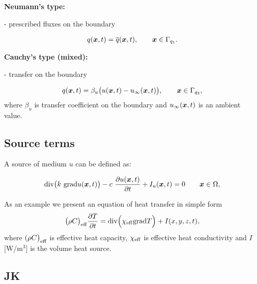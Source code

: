 {\bf Neumann's type:}

- prescribed fluxes on the boundary

\begin{eqnarray}
q(\mbox{\boldmath$x$},t) = \overline{q}(\mbox{\boldmath$x$},t), \qquad \mbox{\boldmath$x$} \in \Gamma_{q_1}. \nonumber
\end{eqnarray}

{\bf Cauchy's type (mixed):}

- transfer on the boundary

\begin{eqnarray}
q(\mbox{\boldmath$x$},t) = \beta_u\big({u}(\mbox{\boldmath$x$},t) - {u}_\infty(\mbox{\boldmath$x$},t)\big), \qquad \mbox{\boldmath$x$} \in \Gamma_{q_2}, \nonumber
\end{eqnarray}
where $\beta_u$ is transfer coefficient on the boundary and ${u}_\infty(\mbox{\boldmath$x$},t)$ is an ambient value.
\subsection{Source terms}

A source of medium $u$ can be defined as:

\begin{eqnarray}
{\rm div} \big(k\ {\rm grad} u(\tenss{x},t) \big) -  c\ \frac{\partial  u(\tenss{x},t)}{\partial t} + I_u(\tenss{x},t) = 0 \qquad \tenss{x} 
\in \Omega,\nonumber
\end{eqnarray}

As an example we present an equation of heat transfer in simple form
\begin{eqnarray}\label{hydr1}
\big( \rho C \big)_{\rm eff} \frac{\partial T}{\partial t} = {\rm div}\Big( \chi_{\rm eff} {\rm grad} T\Big) + I(x,y,z,t),
\end{eqnarray}
where $( \rho C \big)_{\rm eff}$ is effective heat capacity, $\chi_{\rm eff}$ is effective heat conductivity and 
$I$ [W/m$^3$] is the volume heat source. 

\subsection{JK}

